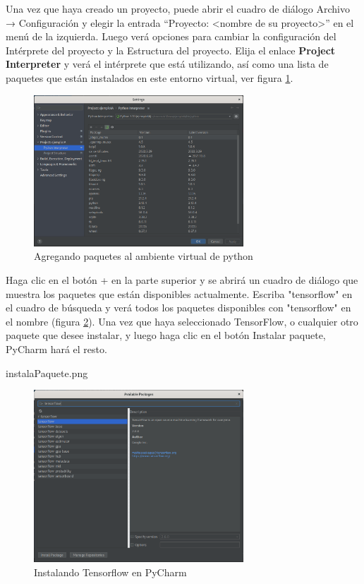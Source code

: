 Una vez que haya creado un proyecto, puede abrir el cuadro de diálogo Archivo → Configuración y elegir la entrada ``Proyecto: <nombre de su proyecto>'' en el menú de la izquierda. Luego verá opciones para cambiar la configuración del Intérprete del proyecto y la Estructura del proyecto. Elija el enlace \textbf{Project Interpreter} y verá el intérprete que está utilizando, así como una lista de paquetes que están instalados en este entorno virtual, ver figura \ref{cap3:003}.



\begin{figure}[htb]
	\centering
	\includegraphics[width=0.7\textwidth]{capitulo3/agregarTensorflow.png}
	\caption{Agregando paquetes al ambiente virtual de python}
	\label{cap3:003}
\end{figure}


Haga clic en el botón + en la parte superior y se abrirá un cuadro de diálogo que muestra los paquetes que están disponibles actualmente. Escriba "tensorflow" en el cuadro de búsqueda y verá todos los paquetes disponibles con "tensorflow" en el nombre (figura \ref{cap3:004}). Una vez que haya seleccionado TensorFlow, o cualquier otro paquete que desee instalar, y luego haga clic en el botón Instalar paquete, PyCharm hará el resto.

instalaPaquete.png

\begin{figure}[htb]
	\centering
	\includegraphics[width=0.7\textwidth]{capitulo3/instalaPaquete.png}
	\caption{Instalando Tensorflow en PyCharm}
	\label{cap3:004}
\end{figure}

